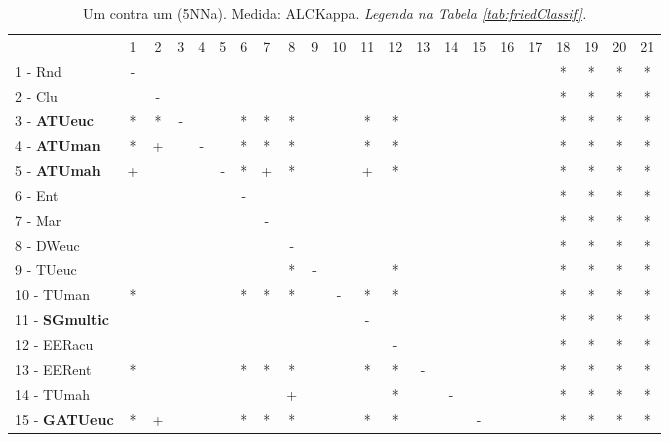 \begin{table}[h]
\caption{Um contra um (5NNa). Medida: ALCKappa. \textit{Legenda na Tabela \ref{tab:friedClassif}.}}
\begin{center}\begin{tabular}{lcc|cc|cc|cc|cc|cc|cc|cc|cc|cc|c}
 			& 1 & 2 & 3 & 4 & 5 & 6 & 7 & 8 & 9 & 10 & 11 & 12 & 13 & 14 & 15 & 16 & 17 & 18 & 19 & 20 & 21\\
1 - Rnd  	& - &   &   &   &   &   &   &   &   &   &   &   &   &   &   &   &   & * & * & * & * \\
2 - Clu  	&   & - &   &   &   &   &   &   &   &   &   &   &   &   &   &   &   & * & * & * & * \\ \hline
3 - \textbf{ATUeuc}	& * & * & - &   &   & * & * & * &   &   & * & * &   &   &   &   &   & * & * & * & * \\
4 - \textbf{ATUman}	& * & + &   & - &   & * & * & * &   &   & * & * &   &   &   &   &   & * & * & * & * \\ \hline
5 - \textbf{ATUmah}	& + &   &   &   & - & * & + & * &   &   & + & * &   &   &   &   &   & * & * & * & * \\
6 - Ent  	&   &   &   &   &   & - &   &   &   &   &   &   &   &   &   &   &   & * & * & * & * \\ \hline
7 - Mar  	&   &   &   &   &   &   & - &   &   &   &   &   &   &   &   &   &   & * & * & * & * \\
8 - DWeuc	&   &   &   &   &   &   &   & - &   &   &   &   &   &   &   &   &   & * & * & * & * \\ \hline
9 - TUeuc	&   &   &   &   &   &   &   & * & - &   &   & * &   &   &   &   &   & * & * & * & * \\
10 - TUman	& * &   &   &   &   & * & * & * &   & - & * & * &   &   &   &   &   & * & * & * & * \\ \hline
11 - \textbf{SGmultic}	&   &   &   &   &   &   &   &   &   &   & - &   &   &   &   &   &   & * & * & * & * \\
12 - EERacu	&   &   &   &   &   &   &   &   &   &   &   & - &   &   &   &   &   & * & * & * & * \\ \hline
13 - EERent	& * &   &   &   &   & * & * & * &   &   & * & * & - &   &   &   &   & * & * & * & * \\
14 - TUmah	&   &   &   &   &   &   &   & + &   &   &   & * &   & - &   &   &   & * & * & * & * \\ \hline
15 - \textbf{GATUeuc}	& * & + &   &   &   & * & * & * &   &   & * & * &   &   & - &   &   & * & * & * & * \\

\end{tabular}
\end{center}
\end{table}
